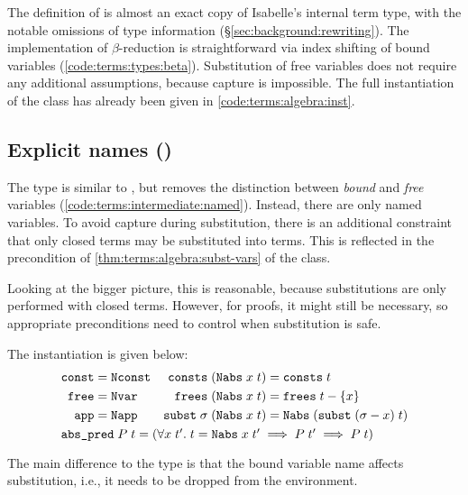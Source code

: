 The definition of  is almost an exact copy of Isabelle's internal term type, with the notable omissions of type information (§\ref{sec:background:rewriting}).
The implementation of $\beta$-reduction is straightforward via index shifting of bound variables (\cref{code:terms:types:beta}).
Substitution of free variables does not require any additional assumptions, because capture is impossible.
The full instantiation of the  class has already been given in \cref{code:terms:algebra:inst}.

\subsection{Explicit names ()}

The  type is similar to , but removes the distinction between \emph{bound} and \emph{free} variables (\cref{code:terms:intermediate:named}).
Instead, there are only named variables.
To avoid capture during substitution, there is an additional constraint that only closed terms may be substituted into terms.
This is reflected in the precondition of \cref{thm:terms:algebra:subst-vars} of the  class.

Looking at the bigger picture, this is reasonable, because substitutions are only performed with closed terms.
However, for proofs, it might still be necessary, so appropriate preconditions need to control when substitution is safe.

The instantiation  is given below:
%
\begin{align*}
  \holconst{const} &= \holconst{Nconst}  &  \holconst{consts}\;(\holconst{Nabs}\;x\;t) &= \holconst{consts}\;t \\
  \holconst{free} &= \holconst{Nvar} & \holconst{frees}\;(\holconst{Nabs}\;x\;t) &= \holconst{frees}\;t - \{x\} \\
  \holconst{app} &= \holconst{Napp} & \holconst{subst}\;\sigma\;(\holconst{Nabs}\;x\;t) &= \holconst{Nabs}\;(\holconst{subst}\;(\sigma - x)\;t) \\
  \omit\rlap{$\holconst{abs\_pred}\;P\;t = (\forall x\;t'.\;t = \holconst{Nabs}\;x\;t' \implies P\;t' \implies P\;t)$}
\end{align*}

\noindent
The main difference to the  type is that the bound variable name affects substitution, i.e., it needs to be dropped from the environment.

